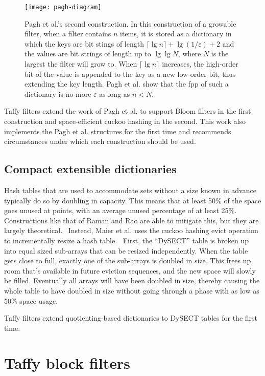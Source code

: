 \documentclass[sigconf]{acmart}
\newcommand{\etal}{et al.}
\begin{document}
\begin{figure}
\texttt{[image: pagh-diagram]}
\caption{\label{pagh-diagram}
Pagh \etal{}'s second construction.
In this construction of a growable filter, when a filter contains $n$ items, it is stored as a dictionary in which the keys are bit stings of length $\lceil \lg n \rceil + \lg (1/\varepsilon) + 2$ and the values are bit strings of length up to $\lg \lg N$, where $N$ is the largest the filter will grow to.
When $\lceil \lg n \rceil$ increases, the high-order bit of the value is appended to the key as a new low-order bit, thus extending the key length.
Pagh \etal{} show that the fpp of such a dictionary is no more $\varepsilon$ as long as $n < N$.
}
\end{figure}

Taffy filters extend the work of Pagh \etal{} to support Bloom filters in the first construction and space-efficient cuckoo hashing in the second.
This work also implements the Pagh \etal{} structures for the first time and recommends circumstances under which each construction should be used.

\subsection{Compact extensible dictionaries}

Hash tables that are used to accommodate sets without a size known in advance typically do so by doubling in capacity.
This means that at least 50\% of the space goes unused at points, with an average unused percentage of at least 25\%.
Constructions like that of Raman and Rao are able to mitigate this, but they are largely theoretical.~\cite{succinct}
Instead, Maier \etal{} uses the cuckoo hashing evict operation to incrementally resize a hash table.~\cite{dysect}
First, the ``DySECT'' table is broken up into equal sized sub-arrays that can be resized independently.
When the table gets close to full, exactly one of the sub-arrays is doubled in size.
This frees up room that's available in future eviction sequences, and the new space will slowly be filled.
Eventually all arrays will have been doubled in size, thereby causing the whole table to have doubled in size without going through a phase with as low as 50\% space usage.

Taffy filters extend quotienting-based dictionaries to DySECT tables for the first time.

\section{Taffy block filters}
\label{pbf}
\end{document}
